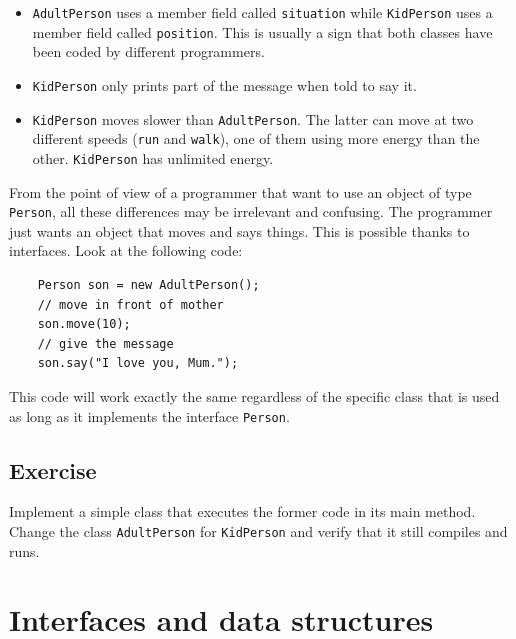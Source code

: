 \begin{itemize}
\item \verb+AdultPerson+ uses a member field called \verb+situation+
  while \verb+KidPerson+ uses a member field called
  \verb+position+. This is usually a sign that both classes have been
  coded by different programmers.
\item \verb+KidPerson+ only prints part of the message when told to
  say it.
\item \verb+KidPerson+ moves slower than \verb+AdultPerson+. The
  latter can move at two different speeds (\verb+run+ and
  \verb+walk+), one of them using more 
  energy than the other. \verb+KidPerson+ has unlimited energy. 
\end{itemize}

From the point of view of a programmer that want to use an object of
type \verb+Person+, all these differences may be irrelevant and
confusing. The programmer just wants an object that moves and says
things. This is possible thanks to interfaces. Look at the following
code: 

\begin{verbatim}
    Person son = new AdultPerson();
    // move in front of mother
    son.move(10);
    // give the message
    son.say("I love you, Mum.");
\end{verbatim}

This code will work exactly the same regardless of the specific class
that is used as long as it
implements the interface \verb+Person+. 

\subsection*{Exercise}
\label{sec:exercise}

Implement a simple class that executes the former code in its main
method. Change the class \verb+AdultPerson+ for \verb+KidPerson+ and
verify that it still compiles and runs. 

\section{Interfaces and data structures}
\label{sec:interfaces-lists}

